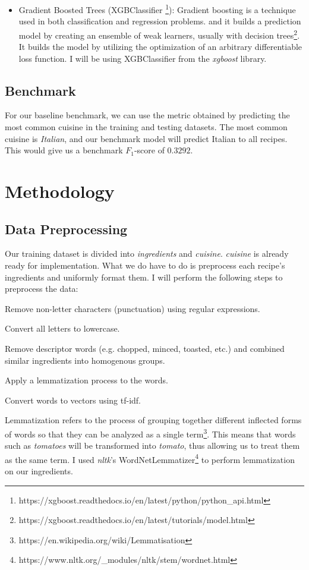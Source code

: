 \documentclass[12pt]{article}
\begin{document}
\begin{itemize}
	\item Gradient Boosted Trees (XGBClassifier \footnote{https://xgboost.readthedocs.io/en/latest/python/python\_api.html}): Gradient boosting is a technique used in both classification and regression problems. and it builds a prediction model by creating an ensemble of weak learners, usually with decision trees\footnote{https://xgboost.readthedocs.io/en/latest/tutorials/model.html}. It builds the model by utilizing the optimization of an arbitrary differentiable loss function. I will be using XGBClassifier from the \textit{xgboost} library.
\end{itemize}

\subsection{Benchmark}
For our baseline benchmark, we can use the metric obtained by predicting the most common cuisine in the training and testing datasets. The most common cuisine is \textit{Italian}, and our benchmark model will predict Italian to all recipes. This would give us a benchmark $F_1$-score of $0.3292$.

\section{Methodology}
\subsection{Data Preprocessing}
Our training dataset is divided into \textit{ingredients} and \textit{cuisine}. \textit{cuisine} is already ready for implementation. What we do have to do is preprocess each recipe's ingredients and uniformly format them. I will perform the following steps to preprocess the data:

\begin{legal}
	\item Remove non-letter characters (punctuation) using regular expressions.
	\item Convert all letters to lowercase.
	\item Remove descriptor words (e.g. chopped, minced, toasted, etc.) and combined similar ingredients into homogenous groups.
	\item Apply a lemmatization process to the words.	
	\item Convert words to vectors using tf-idf.
\end{legal}

\noindent
Lemmatization refers to the process of grouping together different inflected forms of words so that they can be analyzed as a single term\footnote{https://en.wikipedia.org/wiki/Lemmatisation}. This means that words such as \textit{tomatoes} will be transformed into \textit{tomato}, thus allowing us to treat them as the same term. I used \textit{nltk}'s WordNetLemmatizer\footnote{https://www.nltk.org/\_modules/nltk/stem/wordnet.html} to perform lemmatization on our ingredients.
\end{document}
